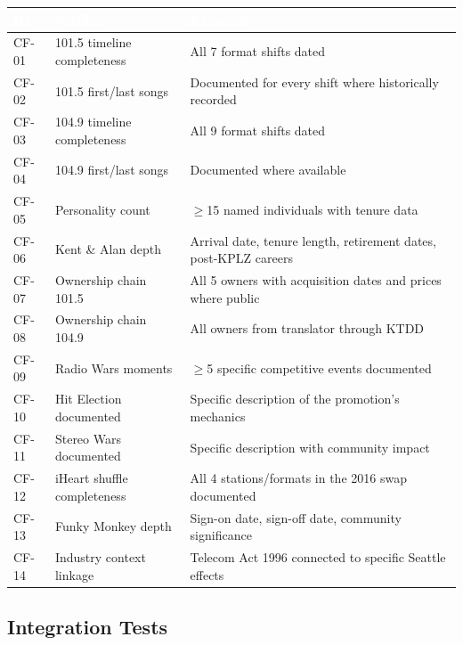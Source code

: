 \documentclass[11pt,letterpaper]{article}
\newcommand{\tableheader}[1]{\textbf{\sffamily\textcolor{white}{#1}}}
\begin{document}
\begin{center}
\begin{tabularx}{\textwidth}{C{1.2cm}L{3.5cm}X}
\toprule
{}
\tableheader{ID} & \tableheader{Verifies} & \tableheader{Expected} \\
\midrule
CF-01 & 101.5 timeline completeness & All 7 format shifts dated \\
CF-02 & 101.5 first/last songs & Documented for every shift where historically recorded \\
CF-03 & 104.9 timeline completeness & All 9 format shifts dated \\
CF-04 & 104.9 first/last songs & Documented where available \\
CF-05 & Personality count & $\geq$15 named individuals with tenure data \\
CF-06 & Kent \& Alan depth & Arrival date, tenure length, retirement dates, post-KPLZ careers \\
CF-07 & Ownership chain 101.5 & All 5 owners with acquisition dates and prices where public \\
CF-08 & Ownership chain 104.9 & All owners from translator through KTDD \\
CF-09 & Radio Wars moments & $\geq$5 specific competitive events documented \\
CF-10 & Hit Election documented & Specific description of the promotion's mechanics \\
CF-11 & Stereo Wars documented & Specific description with community impact \\
CF-12 & iHeart shuffle completeness & All 4 stations/formats in the 2016 swap documented \\
CF-13 & Funky Monkey depth & Sign-on date, sign-off date, community significance \\
CF-14 & Industry context linkage & Telecom Act 1996 connected to specific Seattle effects \\
\bottomrule
\end{tabularx}
\end{center}

\subsection{Integration Tests}
\end{document}
